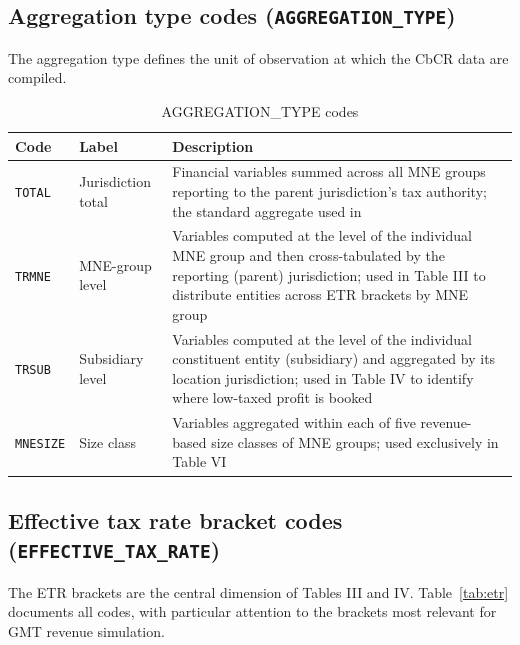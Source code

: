 \documentclass[11pt,a4paper]{article}
\newcommand{\code}[1]{\texttt{#1}}
\begin{document}
\subsection{Aggregation type codes (\texttt{AGGREGATION\_TYPE})}

The aggregation type defines the unit of observation at which the CbCR data are
compiled. 

\begin{table}[H]
\centering
\caption{AGGREGATION\_TYPE codes}
\label{tab:aggtypes}
\begin{tabular}{@{}llp{8cm}@{}}
\toprule
Code & Label & Description \\
\midrule
\code{TOTAL}   & Jurisdiction total & Financial variables summed across all MNE groups reporting to the parent jurisdiction's tax authority; the standard aggregate used in \citet{barake2022} \\
\code{TRMNE}   & MNE-group level & Variables computed at the level of the individual MNE group and then cross-tabulated by the reporting (parent) jurisdiction; used in Table III to distribute entities across ETR brackets by MNE group \\
\code{TRSUB}   & Subsidiary level & Variables computed at the level of the individual constituent entity (subsidiary) and aggregated by its location jurisdiction; used in Table IV to identify where low-taxed profit is booked \\
\code{MNESIZE} & Size class & Variables aggregated within each of five revenue-based size classes of MNE groups; used exclusively in Table VI \\
\bottomrule
\end{tabular}
\end{table}

\subsection{Effective tax rate bracket codes (\texttt{EFFECTIVE\_TAX\_RATE})}

The ETR brackets are the central dimension of Tables III and IV. Table~\ref{tab:etr}
documents all codes, with particular attention to the brackets most relevant for
GMT revenue simulation.
\end{document}
